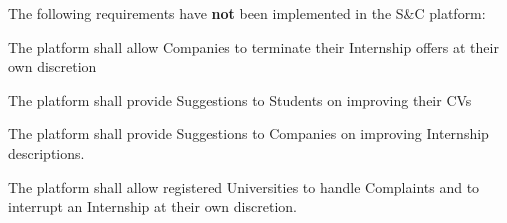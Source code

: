 \vspace{30pt}


The following requirements have \textbf{not} been implemented in the S\&C platform:
\begin{enumerate}[label={\color{titleColor}[R\arabic*]}]
    \setcounter{enumi}{6}
    \item The platform shall allow Companies to terminate their Internship offers at their own discretion
    \setcounter{enumi}{29}
    \item The platform shall provide Suggestions to Students on improving their CVs
    \item The platform shall provide Suggestions to Companies on improving Internship descriptions.
    \setcounter{enumi}{34}
    \item The platform shall allow registered Universities to handle Complaints and to interrupt an Internship
at their own discretion.
\end{enumerate}